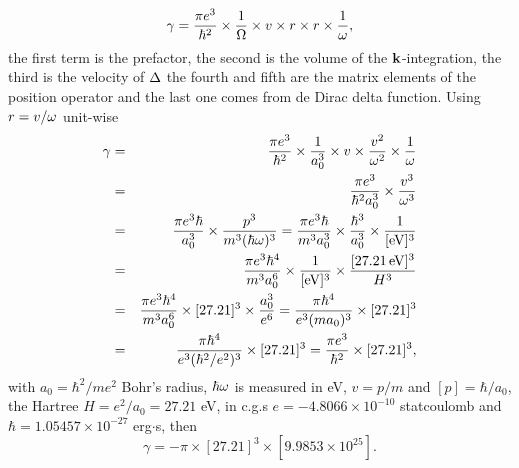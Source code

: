 \documentclass[openany,oneside]{book}
\numberwithin{equation}{section}
\begin{document}
\begin{itemize}
\begin{itemize}
\begin{equation*}\label{unp}
\gamma=\frac{\pi e^3}{\hbar^2}\times\frac{1}{\Omega}\times v \times 
r\times r \times \frac{1}{\omega}
,
\end{equation*} 
the first term is the prefactor, the second is the volume of the
$\mathbf{k}$-integration, the third is the velocity of $\Delta$ the fourth and
fifth are the matrix elements of the position operator and the last
one comes from de Dirac delta function. Using $r=v/\omega$ unit-wise
\begin{eqnarray*}\label{un1}
\gamma
&=&
\frac{\pi e^3}{\hbar^2}\times\frac{1}{a_0^3}\times v \times
\frac{v^2}{\omega^2}
\times \frac{1}{\omega}
\nonumber\\
&=&
\frac{\pi e^3}{\hbar^2a_0^3}\times
\frac{v^3}{\omega^3}
\nonumber\\
&=&
\frac{\pi e^3\hbar}{a_0^3}\times
\frac{p^3}{m^3(\hbar\omega)^3}
=
\frac{\pi e^3\hbar}{m^3a_0^3}\times
\frac{\hbar^3}{a_0^3}
\times
\frac{1}{[\mathrm{eV}]^3}
\nonumber\\
&=&
\frac{\pi e^3\hbar^4}{m^3a_0^6}\times
\frac{1}{[\mathrm{eV}]^3}
\times
\frac{[27.21\,\mathrm{eV}]^3}{H^3}
\nonumber\\
&=&
\frac{\pi e^3\hbar^4}{m^3a_0^6}\times
[27.21]^3
\times
\frac{a_0^3}{e^6}
=
\frac{\pi \hbar^4}{e^3(ma_0)^3}\times
[27.21]^3
\nonumber\\
&=&
\frac{\pi \hbar^4}{e^3(\hbar^2/e^2)^3}\times
[27.21]^3
=
\frac{\pi e^3}{\hbar^2}\times
[27.21]^3
,
\end{eqnarray*}
with $a_0=\hbar^2/me^2$ Bohr's radius, $\hbar\omega$ is measured in eV, $v=p/m$ and
$[p]=\hbar/a_0$, the Hartree $H=e^2/a_0=27.21$ eV, in c.g.s
$e=-4.8066\times 10^{-10}$ statcoulomb and $\hbar=1.05457\times
10^{-27}$ erg$\cdot$s, then
\begin{equation*}\label{gam2}
\gamma=-
\pi
\times
[27.21]^3
\times
[9.9853\times 10^{25}]
.
\end{equation*}


\end{itemize}
\end{itemize}
\end{document}
